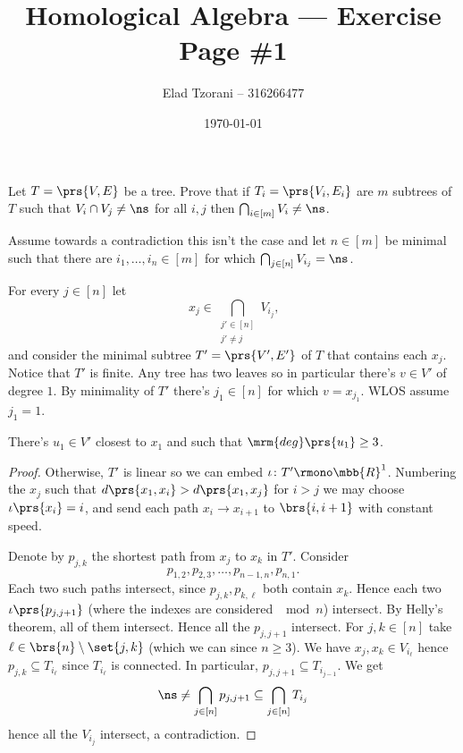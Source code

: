 \documentclass[10pt]{article}
\title{Homological Algebra --- Exercise Page \#1}
\author{Elad Tzorani -- 316266477}
\date{\today}
\begin{document}
\maketitle

\begin{exercise}[2.9]
Let $T = \prs{V,E}$ be a tree. Prove that if $T_i = \prs{V_i, E_i}$ are $m$ subtrees of $T$ such that $V_i \cap V_j \neq \ns$ for all $i,j$ then $\bigcap_{i \in [m]} V_i \neq \ns$.
\end{exercise}

\begin{solution}
Assume towards a contradiction this isn't the case and let $n \in [m]$ be minimal such that there are $i_1, \ldots, i_n \in [m]$ for which $\bigcap_{j \in [n]} V_{i_j} = \ns$.

For every $j \in [n]$ let \[x_j \in \bigcap_{\substack{j' \in [n] \\ j' \neq j}} V_{i_j}\text{,}\]
and consider the minimal subtree $T' = \prs{V', E'}$ of $T$ that contains each $x_j$. Notice that $T'$ is finite.
Any tree has two leaves so in particular there's $v \in V'$ of degree $1$. By minimality of $T'$ there's $j_1 \in [n]$ for which $v = x_{j_1}$. WLOS assume $j_1 = 1$.

\begin{lemma}
There's $u_1 \in V'$ closest to $x_1$ and such that $\mrm{deg}\prs{u_1} \geq 3$.
\end{lemma}

\begin{proof}
Otherwise, $T'$ is linear so we can embed $\iota \colon T' \rmono \mbb{R}^1$. Numbering the $x_j$ such that $d\prs{x_1,x_i} > d\prs{x_1, x_j}$ for $i > j$ we may choose $\iota\prs{x_i} = i$, and send each path $x_i \to x_{i+1}$ to $\brs{i,i+1}$ with constant speed.

Denote by $p_{j,k}$ the shortest path from $x_j$ to $x_k$ in $T'$. Consider \[p_{1,2}, p_{2,3}, \ldots, p_{n-1, n}, p_{n, 1}\text{.}\] Each two such paths intersect, since $p_{j,k}, p_{k,\ell}$ both contain $x_k$. Hence each two $\iota\prs{p_{j,j+1}}$ (where the indexes are considered $\mod{n}$) intersect. By Helly's theorem, all of them intersect. Hence all the $p_{j,j+1}$ intersect. For $j,k \in [n]$ take $\ell \in \brs{n} \setminus \set{j,k}$ (which we can since $n \geq 3$). We have $x_j, x_k \in V_{i_\ell}$ hence $p_{j,k} \subseteq T_{i_\ell}$ since $T_{i_\ell}$ is connected. In particular, $p_{j,j+1} \subseteq T_{i_{j-1}}$. We get
\begin{align*}
\ns \neq \bigcap_{j \in [n]} p_{j,j+1} \subseteq \bigcap_{j \in [n]} T_{i_j}
\end{align*}
hence all the $V_{i_j}$ intersect, a contradiction.
\end{proof}


\end{solution}
\end{document}
